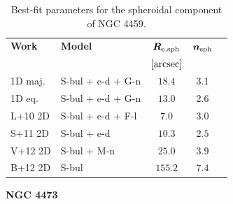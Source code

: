 \documentclass[preprint2]{emulateapj}
\begin{document}
  \begin{table}[h]
  \small
  \caption{Best-fit parameters for the spheroidal component of NGC 4459.}
  \begin{center}
  \begin{tabular}{llccc}
  \hline
  {\bf Work} & {\bf Model}   & $\bm R_{\rm e,sph}$    & $\bm n_{\rm sph}$ \\
    &  &  $[\rm arcsec]$ & \\
  \hline
  1D maj. & S-bul + e-d + G-n & $18.4$  &  $3.1$ \\
  1D eq.  & S-bul + e-d + G-n & $13.0$  &  $2.6$ \\
  \hline
  L+10 2D      & S-bul + e-d + F-l & $7.0$   &  $3.0$ \\
  S+11 2D      & S-bul + e-d	& $10.3$  &  $2.5$ \\
  V+12 2D      & S-bul + M-n	& $25.0$  &  $3.9$ \\
  B+12 2D      & S-bul		& $155.2$ &  $7.4$ \\
  \hline
  \end{tabular}
  \end{center}
  \label{tab:n4459}
  \end{table}




  \clearpage\newpage\noindent
  {\bf NGC 4473 \\}
\end{document}
